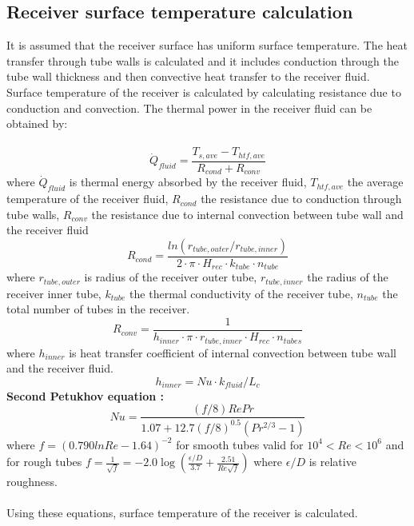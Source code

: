 \subsection{Receiver surface temperature calculation}
It is assumed that the receiver surface has uniform surface temperature. The heat transfer through tube walls is calculated and it includes conduction through the tube wall thickness and then convective heat transfer to the receiver fluid. Surface temperature of the receiver is calculated by calculating resistance due to conduction and convection. The thermal power in the receiver fluid can be obtained by:\\\\
\begin{equation}
\dot Q_{fluid} = \frac {T_{s,ave}-T_{htf,ave}}{R_{cond}+R_{conv}}
\end{equation}
where $ \dot Q_{fluid}$ is thermal energy absorbed by the receiver fluid, $T_{htf,ave}$ the average temperature of the receiver fluid, $R_{cond}$ the resistance due to conduction through tube walls, $R_{conv}$ the resistance due to internal convection between tube wall and the receiver fluid
\begin{equation}
R_{cond} = \frac{ln(r_{tube,outer}/r_{tube,inner})}{2\cdot \pi\cdot H_{rec}\cdot k_{tube}\cdot n_{tube}}
\end{equation}
where $ r_{tube,outer}$ is radius of the receiver outer tube, $ r_{tube,inner}$ the radius of the receiver inner tube, $ k_{tube}$ the thermal conductivity of the receiver tube, $ n_{tube}$ the total number of tubes in the receiver.
\begin{equation}
R_{conv} = \frac {1}{h_{inner}\cdot \pi\cdot r_{tube,inner}\cdot H_{rec}\cdot n_{tubes}}
\end{equation}
where $ h_{inner} $ is heat transfer coefficient of internal convection between tube wall and the receiver fluid.
\begin{equation}
h_{inner}=Nu\cdot k_{fluid}/L_c
\end{equation}
\textbf{{Second Petukhov equation \cite{Cengel.2003}}:}
\begin{equation}
Nu= \frac{(f/8)RePr}{1.07+12.7(f/8)^{0.5}(Pr^{2/3}-1)}
\end{equation}
where $f = (0.790lnRe-1.64)^{-2}$ for smooth tubes valid for $10^4<Re<10^6 $ and for rough tubes $f = \frac{1}{\sqrt{f}}=-2.0\log{\left(\frac{\epsilon/D}{3.7}+\frac{2.51}{Re\sqrt{f}}\right)}$ where $\epsilon/D $ is relative roughness.\\\\
Using these equations, surface temperature of the receiver is calculated.
